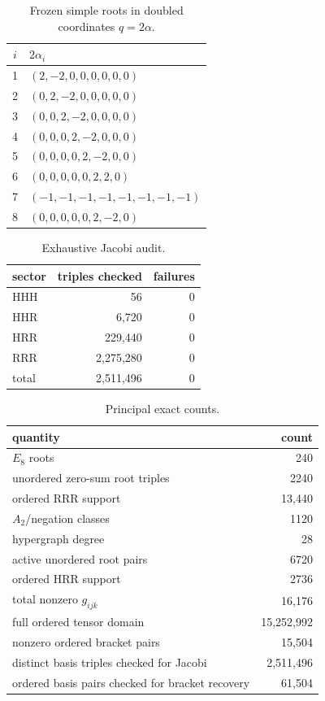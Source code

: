 \documentclass[11pt]{article}
\theoremstyle{definition}
\theoremstyle{remark}
\begin{document}

\begin{table}[p]
\centering
\small
\caption{Frozen simple roots in doubled coordinates $q=2\alpha$.}
\label{tab:simpleroots}
\begin{tabular}{c@{\qquad}l}
\toprule
$i$ & $2\alpha_i$\\
\midrule
1 & $(2,-2,0,0,0,0,0,0)$\\
2 & $(0,2,-2,0,0,0,0,0)$\\
3 & $(0,0,2,-2,0,0,0,0)$\\
4 & $(0,0,0,2,-2,0,0,0)$\\
5 & $(0,0,0,0,2,-2,0,0)$\\
6 & $(0,0,0,0,0,2,2,0)$\\
7 & $(-1,-1,-1,-1,-1,-1,-1,-1)$\\
8 & $(0,0,0,0,0,2,-2,0)$\\
\bottomrule
\end{tabular}
\end{table}


\begin{table}[p]
\centering
\caption{Exhaustive Jacobi audit.}
\label{tab:jacobi}
\begin{tabular}{lrr}
\toprule
sector & triples checked & failures\\
\midrule
HHH & 56 & 0\\
HHR & 6,720 & 0\\
HRR & 229,440 & 0\\
RRR & 2,275,280 & 0\\
\midrule
total & 2,511,496 & 0\\
\bottomrule
\end{tabular}
\end{table}


\begin{table}[p]
\centering
\caption{Principal exact counts.}
\label{tab:summary}
\begin{tabular}{lr}
\toprule
quantity & count\\
\midrule
$E_8$ roots & 240\\
unordered zero-sum root triples & 2240\\
ordered RRR support & 13,440\\
$A_2$/negation classes & 1120\\
hypergraph degree & 28\\
active unordered root pairs & 6720\\
ordered HRR support & 2736\\
total nonzero $g_{ijk}$ & 16,176\\
full ordered tensor domain & 15,252,992\\
nonzero ordered bracket pairs & 15,504\\
distinct basis triples checked for Jacobi & 2,511,496\\
ordered basis pairs checked for bracket recovery & 61,504\\
\bottomrule
\end{tabular}
\end{table}
\end{document}
